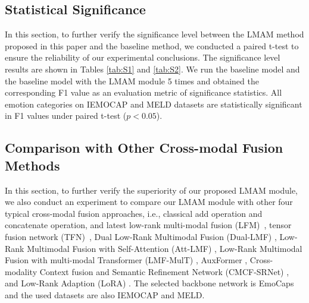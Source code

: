 {{{\subsection{Statistical Significance}}
{In this section, to further verify the significance level between the LMAM method proposed in this paper and the baseline method, we conducted a paired t-test to ensure the reliability of our experimental conclusions. The significance level results are shown in Tables \ref{tab:S1} and \ref{tab:S2}. We run the baseline model and the baseline model with the LMAM module 5 times and obtained the corresponding F1 value as an evaluation metric of significance statistics. All emotion categories on IEMOCAP and MELD datasets are statistically significant in F1 values under paired t-test ($p<0.05$).} 

\subsection{Comparison with Other Cross-modal Fusion Methods}
{In this section, to further verify the superiority of our proposed LMAM module, we also conduct an experiment to compare our LMAM module with other four typical cross-modal fusion approaches, i.e., classical add operation and concatenate operation, and latest low-rank multi-modal fusion (LFM)~\cite{Liu2018EfficientLM}, tensor fusion network (TFN)~\cite{zadeh2017tensor}, {Dual Low-Rank Multimodal Fusion (Dual-LMF) \cite{jin-etal-2020-dual}, Low-Rank Multimodal Fusion with Self-Attention (Att-LMF) \cite{zhu2020multimodal}, Low-Rank Multimodal Fusion with multi-modal Transformer (LMF-MulT) \cite{sahay2020low}, AuxFormer \cite{goncalves2022auxformer}, Cross-modality Context fusion and Semantic Refinement Network (CMCF-SRNet) \cite{zhang2023cross}, and Low-Rank Adaption (LoRA) \cite{hulora}.} The selected backbone network is EmoCaps~\cite{li2022emocaps} and the used datasets are also IEMOCAP and MELD.}

}}
